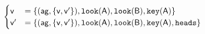 $\begin{cases}
		\poss{v}&= \bra{
	     	(\agent{ag},\bra{\poss{v}, \poss{v^\prime}}),	\looking{a},
	     	\looking{b},
	     	\haskey{a}%
		}\\
			\poss{v}^\prime&= \bra{
	    	(\agent{ag},\bra{\poss{v}, \poss{v^\prime}}),
	    	\looking{a},
	    	\looking{b},
	    	\haskey{a},
	    	\head%
		}\\
\end{cases}$


